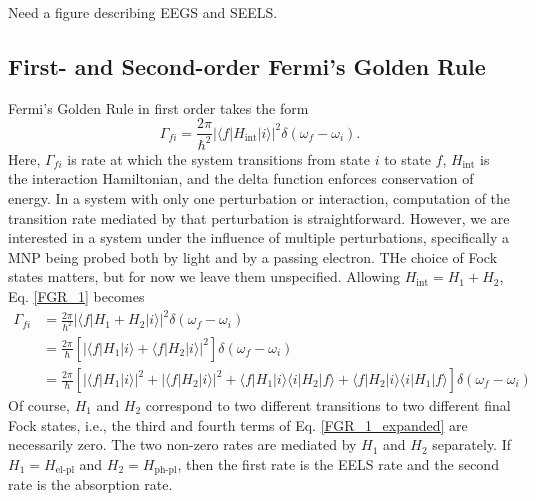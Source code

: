 \documentclass [11pt, proquest] {uwthesis}[2016/11/22]
\begin{document}
Need a figure describing EEGS and SEELS.

\subsection{First- and Second-order Fermi's Golden Rule}

Fermi's Golden Rule in first order takes the form
\begin{equation}
\Gamma_{fi} = \frac{2\pi}{\hbar^2}|\langle f |H_{\textrm{int}}| i \rangle |^2 \delta(\omega_f - \omega_i).
\label{FGR_1}
\end{equation}
Here, $\Gamma_{fi}$ is rate at which the system transitions from state $i$ to state $f$, $H_{\textrm{int}}$ is the interaction Hamiltonian, and the delta function enforces conservation of energy. In a system with only one perturbation or interaction, computation of the transition rate mediated by that perturbation is straightforward. However, we are interested in a system under the influence of multiple perturbations, specifically a MNP being probed both by light and by a passing electron. THe choice of Fock states matters, but for now we leave them unspecified. Allowing $H_{\textrm{int}} = H_1 + H_2$, Eq. \ref{FGR_1} becomes
\begin{equation}
\begin{aligned}
\Gamma_{fi} &= \frac{2\pi}{\hbar^2}|\langle f |H_1 + H_2| i \rangle |^2 \delta(\omega_f - \omega_i)\\
&= \frac{2\pi}{\hbar}\left[|\langle f |H_1| i \rangle + \langle f |H_2| i \rangle |^2\right] \delta(\omega_f - \omega_i)\\
& = \frac{2\pi}{\hbar}\left[|\langle f|H_1|i \rangle|^2 + |\langle f|H_2|i \rangle|^2 + \langle f|H_1|i \rangle \langle i|H_2|f \rangle + \langle f|H_2|i \rangle \langle i|H_1|f \rangle\right]\delta(\omega_f - \omega_i)
\label{FGR_1_expanded}
\end{aligned}
\end{equation}
Of course, $H_1$ and $H_2$ correspond to two different transitions to two different final Fock states, i.e., the third and fourth terms of Eq. \ref{FGR_1_expanded} are necessarily zero. The two non-zero rates are mediated by $H_1$ and $H_2$ separately. If $H_1 = H_\textrm{el-pl}$ and $H_2 = H_{\textrm{ph-pl}}$, then the first rate is the EELS rate and the second rate is the absorption rate.
\end{document}
